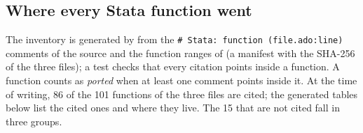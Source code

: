 \subsection{Where every Stata function went}\label{note:map}

The inventory is generated by  from the \texttt{\# Stata: function (file.ado:line)} comments of
the source and the function ranges of  (a manifest with the SHA-256 of the three
 files); a test checks that every citation points inside a function. A function counts as \emph{ported} when
at least one comment points inside it. At the time of writing, 86 of the 101 functions of the three files are cited; the generated
tables below list the cited ones and where they live. The 15 that are not cited fall in three groups.

